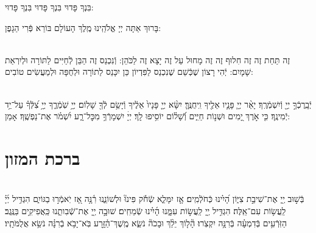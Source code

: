 \documentclass[twoside, openany, parskip=half, 11pt]{book}
\begin{document}
\begin{sometimes}
בִּנְךָ פָּדוּי בִּנְךָ פָּדוּי בִּנְךָ פָּדוּי:

בָּרוּךְ אַתָּה יְיָ אֱלֹהֵֽינוּ מֶֽלֶךְ הָעוֹלָם בּוֹרֵא פְּֿרִי הַגָפֶן:

 \\
זֶה תַּחַת זֶה זֶה חִלוּף זֶה זֶה מָחוּל עַל זֶה יָצָא זֶה לַכֹּהֵן:
וְֿנִכְנַס זֶה הַבֵּן לְֿחַיִּים לַתּוֹרָה וּלְיִרְאַת שָׁמָיִם:
יְֿהִי רָצוֹן שֶׁכְּֿשֵׁם שֶׁנִכְנַס לַפִּדְיוֹן כֵּן יִכָּנֵס לַתוֹרָה וּלְחֻפָּה וּלְמַעֲשִׂים טוֹבִים:

\\
יְֿבָֽרֶכְֿךָ֣ יְיָ֖ וְֿיִשְׁמְֿרֶֽךָ׃ יָאֵ֨ר יְיָ֧ פָּנָ֛יו אֵלֶ֖יךָ וִֽיחֻנֶּֽךָּ׃ יִשָּׂ֨א יְיָ֤ פָּנָיו֙ אֵלֶ֔יךָ וְֿיָשֵׂ֥ם לְֿךָ֖ שָׁלֽוֹם׃
יְיָ֥ שֹֽׁמְֿרֶ֑ךָ יְיָ֥ צִ֝לְּֿךָ֗ עַל־יַ֥ד יְֿמִינֶֽךָ׃
כִּ֤י אֹ֣רֶךְ יָ֭מִים וּשְׁנ֣וֹת חַיִּ֑ים וְֿ֝שָׁל֗וֹם יוֹסִ֥יפוּ לָֽךְ׃
יְיָׄ יִשְׁמָרְֿךָ֥ מִכׇּל־רָ֑ע יִ֝שְׁמֹ֗ר אֶת־נַפְשֶֽׁךָ׃ אָמֵן:


\chapter[ברכת המזון]{ ברכת המזון }

%
\\
בְּֿשׁ֣וּב יְ֖יָ אֶת־שִׁיבַ֣ת צִיּ֑וֹן הָ֝יִ֗ינוּ כְּֿחֹלְֿמִֽים׃ אָ֤ז יִמָּלֵ֢א שְֿׂחֹ֡ק פִּינוּ֘ וּלְשׁוֹנֵ֢נוּ רִ֫נָּ֥ה אָ֭ז יֹֽאמְֿר֣וּ בַגּוֹיִ֑ם הִגְדִּ֥יל יְ֜יָ֗ לַֽעֲשׂ֥וֹת עִם־אֵֽלֶּה׃ הִגְדִּ֥יל יְ֖יָ לַֽעֲשׂ֣וֹת עִמָּ֑נוּ הָ֜יִ֗ינוּ שְֿׂמֵחִֽים׃ שׁוּבָ֣ה יְ֖יָ אֶת־שְֿׁבִותֵ֑נוּ כַּֽאֲפִיקִ֥ים בַּנֶּֽגֶב׃ הַזֹּֽרְֿעִ֥ים בְּֿדִמְעָ֗ה בְּֿרִנָּ֥ה יִקְצֹֽרוּ׃ הָ֘ל֤וֹךְ יֵלֵ֨ךְ וּבָכֹה֘ נֹשֵׂ֢א מֶֽשֶׁךְ־הַ֫זָּ֥רַע בֹּֽא־יָבֹ֥א בְֿרִנָּ֗ה נֹשֵׂ֥א אֲלֻמֹּתָֽיו׃


\end{sometimes}
\end{document}
